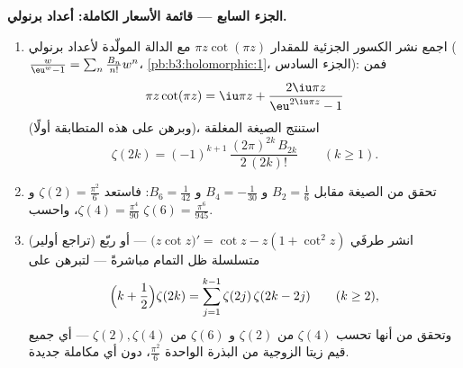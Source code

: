 \begin{problem}
\begin{enumerate}[resume]
\end{enumerate}
\medskip
\noindent\textbf{الجزء السابع --- قائمة الأسعار الكاملة:
أعداد برنولي.}
\begin{enumerate}[resume]
  \item اجمع نشر الكسور الجزئية للمقدار $\pi
        z\cot(\pi z)$ مع الدالة
        المولّدة لأعداد برنولي ($\frac{w}{\eu^w - 1} =
        \sum_n\frac{B_n}{n!}w^n$، \cref{pb:b3:holomorphic:1}، الجزء
        السادس): فمن
        \[
        \pi z\cot(\pi z) = \iu\pi z +
        \frac{2\iu\pi z}{\eu^{2\iu\pi z} - 1}
        \]
        (وبرهن على هذه المتطابقة أولًا)، استنتج الصيغة المغلقة
        \[
        \zeta(2k) = (-1)^{k+1}\,
        \frac{(2\pi)^{2k}\,B_{2k}}{2\,(2k)!}
        \qquad (k \geq 1).
        \]
  \item تحقق من الصيغة مقابل $B_2 = \frac16$ و $B_4 =
        -\frac1{30}$
        و $B_6 = \frac1{42}$: فاستعد $\zeta(2) =
        \frac{\pi^2}6$ و $\zeta(4) = \frac{\pi^4}{90}$، واحسب $\zeta(6) = \frac{\pi^6}{945}$.
  \item (تراجع أولير) انشر طرفَي $\bigl(z\cot z\bigr)' = \cot z - z(1 + \cot^2z)$ --- أو ربّع متسلسلة
        ظل التمام مباشرةً --- لتبرهن على
        \[
        \Bigl(k + \frac12\Bigr)\zeta(2k) =
        \sum_{j=1}^{k-1}\zeta(2j)\,\zeta(2k - 2j)
        \qquad (k \geq 2),
        \]
        وتحقق من أنها تحسب $\zeta(4)$ من $\zeta(2)$ و
        $\zeta(6)$ من $\zeta(2), \zeta(4)$ --- أي جميع قيم زيتا الزوجية من
        البذرة الواحدة $\frac{\pi^2}6$، دون أي مكاملة جديدة.
\end{enumerate}
\end{problem}
